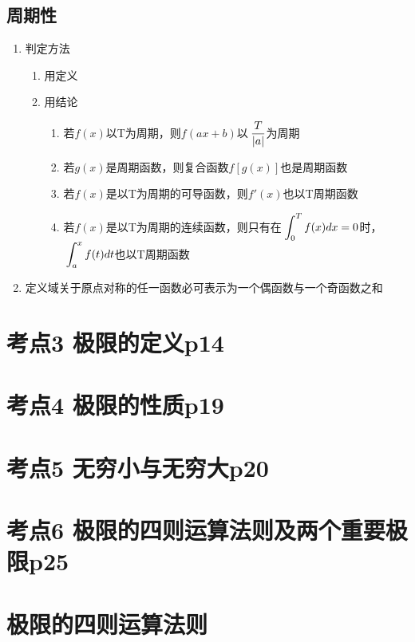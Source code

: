 \subsection{周期性}

\begin{enumerate}
    \item 判定方法\begin{enumerate}
        \item 用定义
        \item 用结论\begin{enumerate}
            \item 若$f(x)$以T为周期，则$f(ax+b)$以$\displaystyle\hspace{.2em}\frac{T}{|a|}$为周期
            \item 若$g(x)$是周期函数，则复合函数$f[g(x)]$也是周期函数
            \item 若$f(x)$是以T为周期的可导函数，则$f'(x)$也以T周期函数
            \item 若$f(x)$是以T为周期的连续函数，则只有在$\displaystyle\hspace{.2em}\int_{0}^{T}f(x)dx=0$时，$\displaystyle\hspace{.2em}\int_{a}^{x}f(t)dt$也以T周期函数
        \end{enumerate}
    \end{enumerate}
    \item 定义域关于原点对称的任一函数必可表示为一个偶函数与一个奇函数之和
\end{enumerate}

\section{考点3 极限的定义p14}

\section{考点4 极限的性质p19}

\section{考点5 无穷小与无穷大p20}

\section{考点6 极限的四则运算法则及两个重要极限p25}

\section{极限的四则运算法则}

